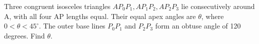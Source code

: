 Three congruent isosceles triangles $AP_0P_1,AP_1P_2,AP_2P_3$ lie consecutively around A, with all four AP lengths equal. Their equal apex angles are $\theta$, where $0<\theta<45^\circ$. The outer base lines $P_0P_1$ and $P_2P_3$ form an obtuse angle of 120 degrees. Find $\theta$.
